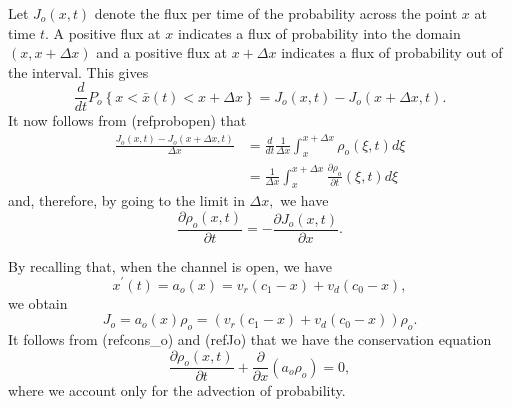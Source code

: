 Let $J_{o}(x,t)$ denote the flux per time of the probability across the point $x$ at time
$t.$ A positive flux at $x$ indicates a flux of probability into
the domain $\left(  x,x+\Delta x\right)$ and a positive flux at $x+\Delta
x$ indicates a flux of probability out of the interval. This gives
\begin{equation}
\frac{d}{dt}P_{o}\left\{  x<\bar{x}(t)<x+\Delta x\right\}  =J_{o}(x,t)-J_{o}
(x+\Delta x,t).\label{p2}
\end{equation} 
It now follows from (ref{probopen}) that
\begin{align*}
\frac{J_{o}(x,t)-J_{o}(x+\Delta x,t)}{\Delta x} &  =\frac{d}{dt}\frac
{1}{\Delta x}\int_{x}^{x+\Delta x}\rho_{o}\left(  \xi,t\right)  d\xi\\
&  =\frac{1}{\Delta x}\int_{x}^{x+\Delta x}\frac{\partial\rho_{o}}{\partial
t}\left(  \xi,t\right)  d\xi
\end{align*}
and, therefore, by going to the limit in $\Delta x,$ we have
\begin{equation}
\frac{\partial\rho_{o}\left(  x,t\right)  }{\partial t}=-\frac{\partial
J_{o}(x,t)}{\partial x}.\label{cons_o}
\end{equation}
\begin{comment}
Next, we have to consider about the size of the flux $J_{o}$. Let us start by
observing that the change in concentration $x$ over the time step $\Delta t$
is given by
\[
\Delta x=x(t+\Delta t)-x(t)=x^{\prime}(t)\Delta t+O(\Delta t^{2}).
\]
Note also that the probability of the concentration being in that interval
(and the channel being open) is given by
\[
\rho_{o}(x,t)\Delta x=\rho_{o}(x,t)x^{\prime}(t)\Delta t+O(\Delta t^{2})
\]
and then the flux of probability per time is given by
\[
J_{o}=\rho_{o}(x,t)\frac{\Delta x}{\Delta t}=\rho_{o}(x,t)x^{\prime
}(t)+O(\Delta t).
\] 
\end{comment}
By recalling that, when the channel is open, we have
\[
x^{\prime}(t)=a_o(x)=v_{r}(c_{1}-x)+v_{d}(c_{0}-x),
\]
we obtain
\begin{equation}
J_{o}=a_o(x)  \rho_{o}=\left(  v_{r}(c_{1}-x)+v_{d}(c_{0}-x)\right)  \rho_{o}.\label{Jo}
\end{equation}
It follows from (ref{cons_o}) and 
(ref{Jo}) that we have the
conservation equation
\begin{equation}
\frac{\partial\rho_{o}\left(  x,t\right)  }{\partial t}+\frac{\partial
}{\partial x}(a_o  \rho_{o})
=0,\label{cons2}
\end{equation}
where we account only for the advection of probability.

